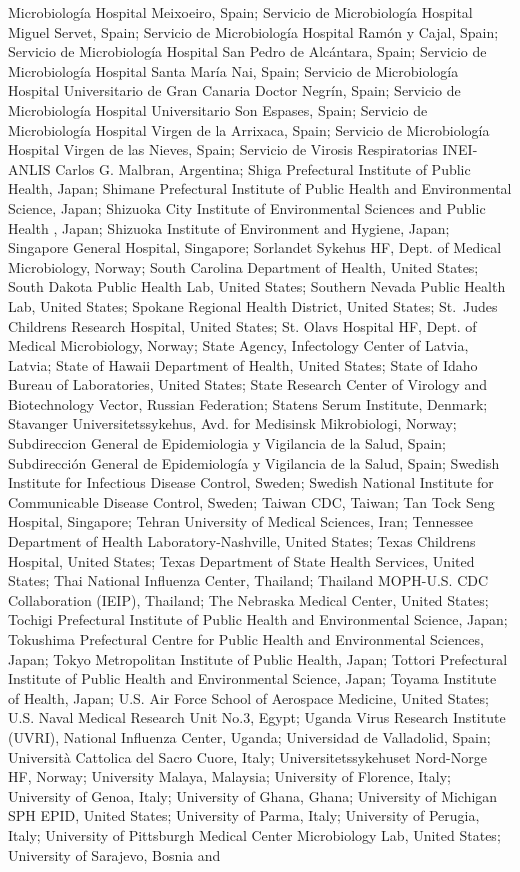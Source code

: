 \documentclass[9pt,lineno]{elife} %
\begin{document}
\begin{appendixbox}
Microbiología Hospital Meixoeiro, Spain; Servicio de Microbiología Hospital Miguel Servet, Spain; Servicio de Microbiología Hospital Ramón y Cajal, Spain; Servicio de Microbiología Hospital San Pedro de Alcántara, Spain; Servicio de Microbiología Hospital Santa María Nai, Spain; Servicio de Microbiología Hospital Universitario de Gran Canaria Doctor Negrín, Spain; Servicio de Microbiología Hospital Universitario Son Espases, Spain; Servicio de Microbiología Hospital Virgen de la Arrixaca, Spain; Servicio de Microbiología Hospital Virgen de las Nieves, Spain; Servicio de Virosis Respiratorias INEI-ANLIS Carlos G. Malbran, Argentina; Shiga Prefectural Institute of Public Health, Japan; Shimane Prefectural Institute of Public Health and Environmental Science, Japan; Shizuoka City Institute of Environmental Sciences and Public Health , Japan; Shizuoka Institute of Environment and Hygiene, Japan; Singapore General Hospital, Singapore; Sorlandet Sykehus HF, Dept. of Medical Microbiology, Norway; South Carolina Department of Health, United States; South Dakota Public Health Lab, United States; Southern Nevada Public Health Lab, United States; Spokane Regional Health District, United States; St.\ Judes Childrens Research Hospital, United States; St. Olavs Hospital HF, Dept. of Medical Microbiology, Norway; State Agency, Infectology Center of Latvia, Latvia; State of Hawaii Department of Health, United States; State of Idaho Bureau of Laboratories, United States; State Research Center of Virology and Biotechnology Vector, Russian Federation; Statens Serum Institute, Denmark; Stavanger Universitetssykehus, Avd. for Medisinsk Mikrobiologi, Norway; Subdireccion General de Epidemiologia y Vigilancia de la Salud, Spain; Subdirección General de Epidemiología y Vigilancia de la Salud, Spain; Swedish Institute for Infectious Disease Control, Sweden; Swedish National Institute for Communicable Disease Control, Sweden; Taiwan CDC, Taiwan; Tan Tock Seng Hospital, Singapore; Tehran University of Medical Sciences, Iran; Tennessee Department of Health Laboratory-Nashville, United States; Texas Childrens Hospital, United States; Texas Department of State Health Services, United States; Thai National Influenza Center, Thailand; Thailand MOPH-U.S. CDC Collaboration (IEIP), Thailand; The Nebraska Medical Center, United States; Tochigi Prefectural Institute of Public Health and Environmental Science, Japan; Tokushima Prefectural Centre for Public Health and Environmental Sciences, Japan; Tokyo Metropolitan Institute of Public Health, Japan; Tottori Prefectural Institute of Public Health and Environmental Science, Japan; Toyama Institute of Health, Japan; U.S. Air Force School of Aerospace Medicine, United States; U.S. Naval Medical Research Unit No.3, Egypt; Uganda Virus Research Institute (UVRI), National Influenza Center, Uganda; Universidad de Valladolid, Spain; Università Cattolica del Sacro Cuore, Italy; Universitetssykehuset Nord-Norge HF, Norway; University Malaya, Malaysia; University of Florence, Italy; University of Genoa, Italy; University of Ghana, Ghana; University of Michigan SPH EPID, United States; University of Parma, Italy; University of Perugia, Italy; University of Pittsburgh Medical Center Microbiology Lab, United States; University of Sarajevo, Bosnia and 
\end{appendixbox}
\end{document}
